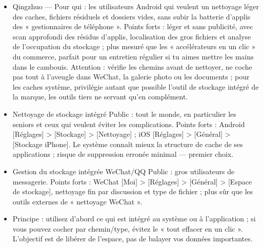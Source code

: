 \begin{itemize}
  \item Qingzhuo — Pour qui : les utilisateurs Android qui veulent un nettoyage léger des caches, fichiers résiduels et dossiers vides, sans subir la batterie d'applis des « gestionnaires de téléphone ». Points forts : léger et sans publicité, avec scan approfondi des résidus d'applis, localisation des gros fichiers et analyse de l'occupation du stockage ; plus mesuré que les « accélérateurs en un clic » du commerce, parfait pour un entretien régulier si tu aimes mettre les mains dans le cambouis. Attention : vérifie les chemins avant de nettoyer, ne coche pas tout à l'aveugle dans WeChat, la galerie photo ou les documents ; pour les caches système, privilégie autant que possible l'outil de stockage intégré de la marque, les outils tiers ne servant qu'en complément.
  \item Nettoyage de stockage intégré Public : tout le monde, en particulier les seniors et ceux qui veulent éviter les complications. Points forts : Android [Réglages] > [Stockage] > [Nettoyage] ; iOS [Réglages] > [Général] > [Stockage iPhone]. Le système connaît mieux la structure de cache de ses applications ; risque de suppression erronée minimal — premier choix.
  \item Gestion du stockage intégrée WeChat/QQ Public : gros utilisateurs de messagerie. Points forts : WeChat [Moi] > [Réglages] > [Général] > [Espace de stockage], nettoyage fin par discussion et type de fichier ; plus sûr que les outils externes de « nettoyage WeChat ».
  \item Principe : utilisez d'abord ce qui est intégré au système ou à l'application ; si vous pouvez cocher par chemin/type, évitez le « tout effacer en un clic ». L'objectif est de libérer de l'espace, pas de balayer vos données importantes.
\end{itemize}


